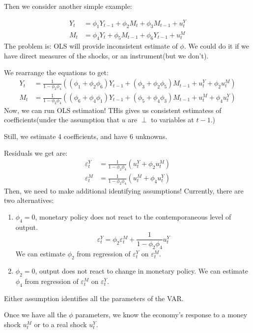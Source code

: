 Then we consider another simple example:
\begin{eg}
    \begin{align*}
        Y_t &= \phi_1 Y_{t-1} + \phi_2 M_{t} + \phi_3 M_{t-1} + u_{t}^Y \\ 
        M_t &= \phi_4 Y_{t} + \phi_5 M_{t-1} + \phi_6 Y_{t-1} + u_{t}^M
    \end{align*}
    The problem is: OLS will provide inconsistent estimate of $\phi$.
    We could do it if we have direct measures of the shocks, or an instrument(but we don't).

    We rearrange the equations to get:
    \begin{align*}
        Y_t &= \frac{1}{1 - \phi_2 \phi_4} \left( (\phi_1 + \phi_2 \phi_6)Y_{t-1} + (\phi_3 + \phi_2 \phi_5)M_{t-1} + u_t^Y + \phi_2 u_t^M \right) \\
        M_t &= \frac{1}{1 - \phi_2 \phi_4} \left( (\phi_6 + \phi_4 \phi_1)Y_{t-1} + (\phi_5 + \phi_4 \phi_3)M_{t-1} + u_t^M + \phi_4 u_t^Y \right)
    \end{align*}
    Now, we can run OLS estimation! THis gives us consistent estimatess of coefficients(under the assumption that $u$ are $\perp$ to variables at $t-1$.)
    
    Still, we estimate 4 coefficients, and have 6 unknowns.

    Residuals we get are:
    \begin{align*}
        \varepsilon_t^Y &= \frac{1}{1-\phi_2 \phi_4} (u_t^Y + \phi_2 u_t^M) \\
        \varepsilon_t^M &= \frac{1}{1-\phi_2 \phi_4} (u_t^M + \phi_4 u_t^Y)
    \end{align*}
    Then, we need to make additional identifying assumptions! Currently, there are two alternatives:
    \begin{enumerate}
        \item $\phi_4 = 0$, monetary policy does not react to the
        contemporaneous level of output.
        \[\varepsilon_t^Y = \phi_2 \varepsilon_t^M + \frac{1}{1-\phi_2 \phi_4} u_t^Y\]
        We can estimate $\phi_2$ from regression of $\varepsilon_t^Y$ on $\varepsilon_t^M$.
        \item $\phi_2 = 0$, output does not react to change in monetary policy.
        We can estimate $\phi_4$ from regression of $\varepsilon_t^M$ on $\varepsilon_t^Y$.
    \end{enumerate}
    Either assumption identiﬁes all the parameters of the VAR.

    Once we have all the $\phi$ parameters, we know the economy's response to a money shock 
    $u_t^M$ or to a real shock $u_t^Y$.
\end{eg}

